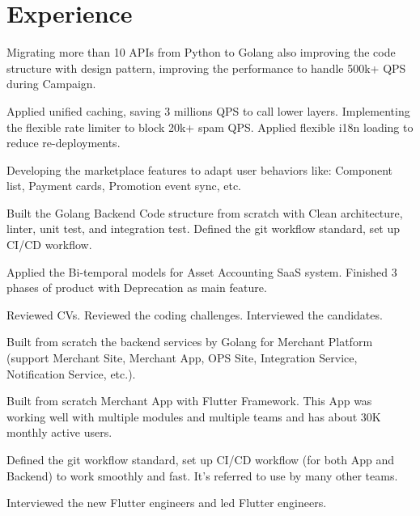 \documentclass[]{deedy-resume-openfont}
\begin{document}
\begin{minipage}[t]{0.69\textwidth} 


\section{Experience}
\vspace{\topsep} %
\begin{tightemize}
\item Migrating more than 10 APIs from Python to Golang also improving the code structure with design pattern, improving the performance to handle 500k+ QPS during Campaign.
\item Applied unified caching, saving 3 millions QPS to call lower layers. Implementing the flexible rate limiter to block 20k+ spam QPS. Applied flexible i18n loading to reduce re-deployments.
\item Developing the marketplace features to adapt user behaviors like: Component list, Payment cards, Promotion event sync, etc.
\end{tightemize}
\sectionsep

\vspace{\topsep} %
\begin{tightemize}
\item Built the Golang Backend Code structure from scratch with Clean architecture, linter, unit test, and integration test. Defined the git workflow standard, set up CI/CD workflow. 
\item Applied the Bi-temporal models for Asset Accounting SaaS system. Finished 3 phases of product with Deprecation as main feature.
\item Reviewed CVs. Reviewed the coding challenges. Interviewed the candidates.
\end{tightemize}
\sectionsep

\begin{tightemize}
\item Built from scratch the backend services by Golang for Merchant Platform (support Merchant Site, Merchant App, OPS Site, Integration Service, Notification Service, etc.).
\item Built from scratch Merchant App with Flutter Framework. This App was working well with multiple modules and multiple teams and has about 30K monthly active users.
\item Defined the git workflow standard, set up CI/CD workflow (for both App and Backend) to work smoothly and fast. It's referred to use by many other teams.
\item Interviewed the new Flutter engineers and led Flutter engineers. 
\end{tightemize}
\sectionsep


\end{minipage}
\end{document}
